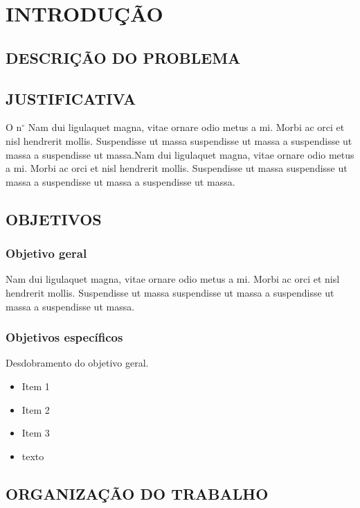 \chapter{INTRODUÇÃO} %
\lipsum[1-1]

\section{DESCRIÇÃO DO PROBLEMA}
\lipsum[1-1]

\section{JUSTIFICATIVA}
O n$^\circ$ Nam dui ligulaquet magna, vitae ornare odio metus a mi. Morbi ac orci et nisl hendrerit mollis. Suspendisse ut massa suspendisse ut massa a suspendisse ut massa a suspendisse ut massa.Nam dui ligulaquet magna, vitae ornare odio metus a mi. Morbi ac orci et nisl hendrerit mollis. Suspendisse ut massa suspendisse ut massa a suspendisse ut massa a suspendisse ut massa.

\section{OBJETIVOS}

\subsection{Objetivo geral}
Nam dui ligulaquet magna, vitae ornare odio metus a mi. Morbi ac orci et nisl hendrerit mollis. Suspendisse ut massa suspendisse ut massa a suspendisse ut massa a suspendisse ut massa.

\subsection{Objetivos específicos}
Desdobramento do objetivo geral. 
 \begin{itemize}
	\item Item 1
	\item Item 2
	\item Item 3
	\item texto
\end{itemize}

 \section{ORGANIZAÇÃO DO TRABALHO}
 \lipsum[1-1]